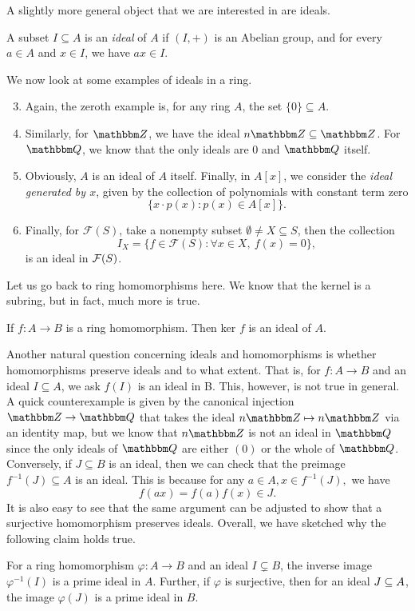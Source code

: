 A slightly more general object that we are interested in  are ideals. 
\begin{definition}[Ideal]\label{def: ideal}
    A subset $I \subseteq A$ is an {\it ideal} of $A$ if $(I,+)$ is an Abelian group, and for every $a \in A$ and $x \in I$, we have $a x \in I$.
\end{definition}

\begin{example}
We now look at some examples of ideals in a ring.
    \begin{enumerate}
    \setcounter{enumi}{2}
        \item Again, the zeroth example is, for any ring $A$, the set 
        $\{0\} \subseteq A$.
        \item Similarly, for ${\Z}$, we have the ideal $n {\Z} \subseteq {\Z}$. For ${\Q}$, we know that the only ideals are 0 and ${\Q}$ itself.
        \item Obviously, $A$ is an ideal of $A$ itself. Finally, in $A[x]$, we consider the {\it ideal generated by $x$}, given by the collection of polynomials with constant term zero
        \[\{x \cdot p(x): p(x) \in A[x]\}.\]
        \item Finally, for $\mathcal{F}(S)$, take a nonempty subset $\emptyset \neq X \subseteq S$, then the collection
        \[I_{X}=\{f \in \mathcal{F}(S)\colon \forall x \in X,\ f(x)=0 \},\] is an ideal in $\calF(S)$.
    \end{enumerate}
\end{example}

Let us go back to ring homomorphisms here. We know that the kernel is a subring, but in fact, much more is true.
\begin{observation}\label{obs: ker-ideal}
If $f: A \rightarrow B$ is a ring homomorphism. Then ker $f$ is an ideal of $A$.
\end{observation}

Another natural question concerning ideals and homomorphisms is whether homomorphisms preserve ideals and to what extent. That is, for $f: A \rightarrow B$ and an ideal $I \subseteq A$, we ask $f(I)$ is an ideal in B. This, however, is not true in general. A quick counterexample is given by the canonical injection ${\Z} \rightarrow {\Q}$ that takes the ideal $n {\Z} \mapsto n {\Z}$ via an identity map, but we know that $n {\Z}$ is not an ideal in ${\Q}$ since the only ideals of ${\Q}$ are either $(0)$ or the whole of ${\Q}$. Conversely, if $J \subseteq B$ is an ideal, then we can check that the preimage $f^{-1}(J) \subseteq A$ is an ideal. This is because for any $a\in A, x  \in f^{-1}(J),$ we have
\[
f(ax) = f(a)f(x) \in J.
\]
It is also easy to see that the same argument can be adjusted to show that a surjective homomorphism preserves ideals. Overall, we have sketched why the following claim holds true.
\begin{observation}
    \label{obs: phi-preserves-ideal}
    For a ring homomorphism $\varphi: A \rightarrow B$ and an ideal $I \subsetneq B$, 
    the inverse image $\varphi^{-1}(I)$ is a prime ideal in $A$. Further, if $\varphi$ is surjective, then for an ideal $J \ss A$, the image $\varphi(J)$ is a prime ideal in $B$.
\end{observation}

